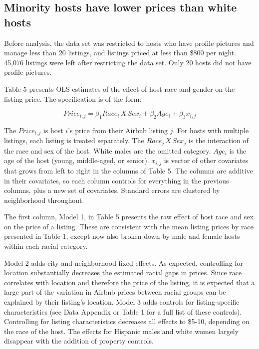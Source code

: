 \subsection{Minority hosts have lower prices than white hosts} 

Before analysis, the data set was restricted to hosts who have profile pictures and manage less than 20 listings, and listings priced at less than \$800 per night. 45,076 listings were left after restricting the data set. Only 20 hosts did not have profile pictures.

Table 5 presents OLS estimates of the effect of host race and gender on the listing price. The specification is of the form: 

\[ Price_{i,j} = \beta_1 Race_{i}\,X \,Sex_i + \beta_2 Age_i + \beta_3 x_{i,j}\]

The $Price_{i,j}$ is host $i$'s price from their Airbnb listing $j$. For hosts with multiple listings, each listing is treated separately. The $Race_{j}\,X \,Sex_j$ is the interaction of the race and sex of the host. White males are the omitted category. $Age_i$ is the age of the host (young, middle-aged, or senior). $x_{i,j}$ is vector of other covariates that grows from left to right in the columns of Table 5. The columns are additive in their covariates, so each column controls for everything in the previous columns, plus a new set of covariates. Standard errors are clustered by neighborhood throughout.

The first column, Model 1, in Table 5 presents the raw effect of host race and sex on the price of a listing. These are consistent with the mean listing prices by race presented in Table 1, except now also broken down by male and female hosts within each racial category.

Model 2 adds city and neighborhood fixed effects. As expected, controlling for location substantially decreases the estimated racial gaps in prices. Since race correlates with location and therefore the price of the listing, it is expected that a large part of the variation in Airbnb prices between racial groups can be explained by their listing's location. Model 3 adds controls for listing-specific characteristics (see Data Appendix or Table 1 for a full list of these controls). Controlling for listing characteristics decreases all effects to \$5-10, depending on the race of the host. The effects for Hispanic males and white women largely disappear with the addition of property controls. 


